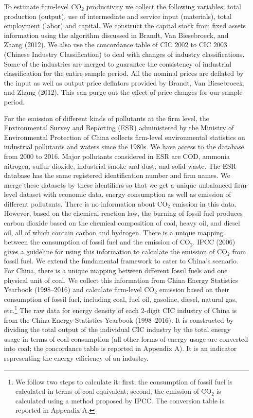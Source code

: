 \documentclass[11pt,a4paper]{article}
\begin{document}
To estimate firm-level CO$_2$ productivity we collect the following variables: total production (output), use of intermediate and service input (materials), total employment (labor) and capital. We construct the capital stock from fixed assets information using the algorithm discussed in Brandt, Van Biesebroeck, and Zhang (2012). We also use the concordance table of CIC 2002 to CIC 2003 (Chinese Industry Classification) to deal with changes of industry classifications. Some of the industries are merged to guarantee the consistency of industrial classification for the entire sample period. All the nominal prices are deflated by the input as well as output price deflators provided by Brandt, Van Biesebroeck, and Zhang (2012). This can purge out the effect of price changes for our sample period.

For the emission of different kinds of pollutants at the firm level, the Environmental Survey and Reporting (ESR) administered by the Ministry of Environmental Protection of China collects firm-level environmental statistics on industrial pollutants and waters since the 1980s. We have access to the database from 2000 to 2016. Major pollutants considered in ESR are COD, ammonia nitrogen, sulfur dioxide, industrial smoke and dust, and solid waste. The ESR database has the same registered identification number and firm names. We merge these datasets by these identifiers so that we get a unique unbalanced firm-level dataset with economic data, energy consumption as well as emission of different pollutants. There is no information about CO$_2$ emission in this data. However, based on the chemical reaction law, the burning of fossil fuel produces carbon dioxide based on the chemical composition of coal, heavy oil, and diesel oil, all of which contain carbon and hydrogen. There is a unique mapping between the consumption of fossil fuel and the emission of CO$_2$. IPCC (2006) gives a guideline for using this information to calculate the emission of CO$_2$ from fossil fuel. We extend the fundamental framework to cater to China's scenario. For China, there is a unique mapping between different fossil fuels and one physical unit of coal. We collect this information from China Energy Statistics Yearbook (1998--2016) and calculate firm-level CO$_2$ emission based on their consumption of fossil fuel, including coal, fuel oil, gasoline, diesel, natural gas, etc.\footnote{We follow two steps to calculate it: first, the consumption of fossil fuel is calculated in terms of coal equivalent; second, the emission of CO$_2$ is calculated using a method proposed by IPCC. The conversion table is reported in Appendix A.} The raw data for energy density of each 2-digit CIC industry of China is from the China Energy Statistics Yearbook (1998--2016). It is constructed by dividing the total output of the individual CIC industry by the total energy usage in terms of coal consumption (all other forms of energy usage are converted into coal; the concordance table is reported in Appendix A). It is an indicator representing the energy efficiency of an industry.
\end{document}

